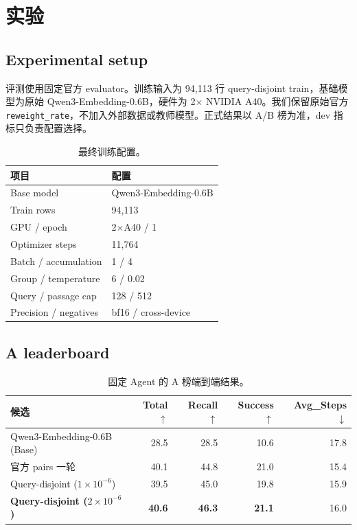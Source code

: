 \documentclass[UTF8,10pt,a4paper,twocolumn]{ctexart}
\begin{document}
\section{实验}

\subsection{Experimental setup}

评测使用固定官方 evaluator。训练输入为 94,113 行 query-disjoint train，基础模型为原始 Qwen3-Embedding-0.6B，硬件为 2$\times$ NVIDIA A40。我们保留原始官方 \texttt{reweight\_rate}，不加入外部数据或教师模型。正式结果以 A/B 榜为准，dev 指标只负责配置选择。

\begin{table}[t]
\centering
\caption{最终训练配置。}
\label{tab:config}
\scriptsize
\begin{tabular}{ll}
\toprule
项目 & 配置\\
\midrule
Base model & Qwen3-Embedding-0.6B\\
Train rows & 94,113\\
GPU / epoch & 2$\times$A40 / 1\\
Optimizer steps & 11,764\\
Batch / accumulation & 1 / 4\\
Group / temperature & 6 / 0.02\\
Query / passage cap & 128 / 512\\
Precision / negatives & bf16 / cross-device\\
\bottomrule
\end{tabular}
\end{table}

\subsection{A leaderboard}

\begin{table}[t]
\centering
\caption{固定 Agent 的 A 榜端到端结果。}
\label{tab:aleaderboard}
\scriptsize
\begin{tabularx}{\columnwidth}{@{}>{\raggedright\arraybackslash}Xrrrr@{}}
\toprule
候选 & Total $\uparrow$ & Recall $\uparrow$ & Success $\uparrow$ & Avg\_Steps $\downarrow$\\
\midrule
Qwen3-Embedding-0.6B (Base) & 28.5 & 28.5 & 10.6 & 17.8\\
官方 pairs 一轮 & 40.1 & 44.8 & 21.0 & 15.4\\
Query-disjoint ($1\times10^{-6}$) & 39.5 & 45.0 & 19.8 & 15.9\\
\textbf{Query-disjoint ($2\times10^{-6}$)} & \textbf{40.6} & \textbf{46.3} & \textbf{21.1} & 16.0\\
\bottomrule
\end{tabularx}
\end{table}
\end{document}
